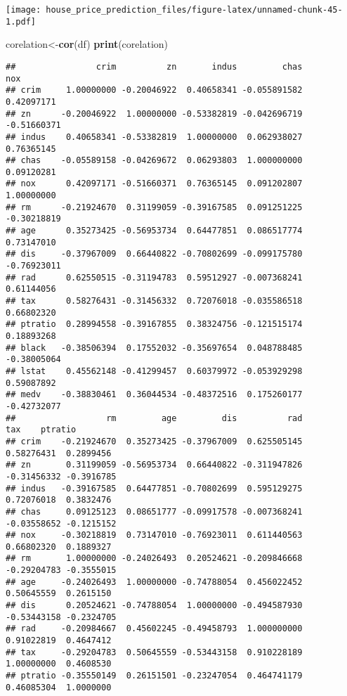 \documentclass[
]{article}
\newenvironment{Shaded}{\begin{snugshade}}{\end{snugshade}}
\newcommand{\KeywordTok}[1]{\textcolor[rgb]{0.13,0.29,0.53}{\textbf{#1}}}
\newcommand{\NormalTok}[1]{#1}
\begin{document}
\texttt{[image: house\_price\_prediction\_files/figure-latex/unnamed-chunk-45-1.pdf]}

\begin{Shaded}
\begin{Highlighting}[]
\NormalTok{corelation<-}\KeywordTok{cor}\NormalTok{(df)}
\KeywordTok{print}\NormalTok{(corelation)}
\end{Highlighting}
\end{Shaded}

\begin{verbatim}
##                crim          zn       indus         chas         nox
## crim     1.00000000 -0.20046922  0.40658341 -0.055891582  0.42097171
## zn      -0.20046922  1.00000000 -0.53382819 -0.042696719 -0.51660371
## indus    0.40658341 -0.53382819  1.00000000  0.062938027  0.76365145
## chas    -0.05589158 -0.04269672  0.06293803  1.000000000  0.09120281
## nox      0.42097171 -0.51660371  0.76365145  0.091202807  1.00000000
## rm      -0.21924670  0.31199059 -0.39167585  0.091251225 -0.30218819
## age      0.35273425 -0.56953734  0.64477851  0.086517774  0.73147010
## dis     -0.37967009  0.66440822 -0.70802699 -0.099175780 -0.76923011
## rad      0.62550515 -0.31194783  0.59512927 -0.007368241  0.61144056
## tax      0.58276431 -0.31456332  0.72076018 -0.035586518  0.66802320
## ptratio  0.28994558 -0.39167855  0.38324756 -0.121515174  0.18893268
## black   -0.38506394  0.17552032 -0.35697654  0.048788485 -0.38005064
## lstat    0.45562148 -0.41299457  0.60379972 -0.053929298  0.59087892
## medv    -0.38830461  0.36044534 -0.48372516  0.175260177 -0.42732077
##                  rm         age         dis          rad         tax    ptratio
## crim    -0.21924670  0.35273425 -0.37967009  0.625505145  0.58276431  0.2899456
## zn       0.31199059 -0.56953734  0.66440822 -0.311947826 -0.31456332 -0.3916785
## indus   -0.39167585  0.64477851 -0.70802699  0.595129275  0.72076018  0.3832476
## chas     0.09125123  0.08651777 -0.09917578 -0.007368241 -0.03558652 -0.1215152
## nox     -0.30218819  0.73147010 -0.76923011  0.611440563  0.66802320  0.1889327
## rm       1.00000000 -0.24026493  0.20524621 -0.209846668 -0.29204783 -0.3555015
## age     -0.24026493  1.00000000 -0.74788054  0.456022452  0.50645559  0.2615150
## dis      0.20524621 -0.74788054  1.00000000 -0.494587930 -0.53443158 -0.2324705
## rad     -0.20984667  0.45602245 -0.49458793  1.000000000  0.91022819  0.4647412
## tax     -0.29204783  0.50645559 -0.53443158  0.910228189  1.00000000  0.4608530
## ptratio -0.35550149  0.26151501 -0.23247054  0.464741179  0.46085304  1.0000000

\end{verbatim}
\end{document}
